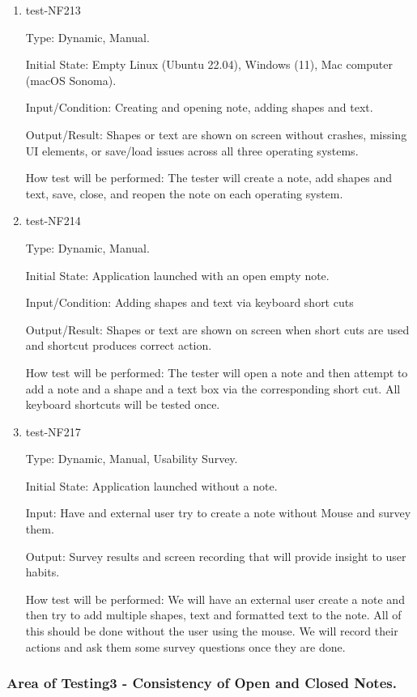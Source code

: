 \documentclass[12pt, titlepage]{article}
\begin{document}
\begin{enumerate}

\item{test-NF213}

Type: Dynamic, Manual.

Initial State: Empty Linux (Ubuntu 22.04), Windows (11), Mac computer (macOS Sonoma).

Input/Condition: Creating and opening note, adding shapes and text.

Output/Result: Shapes or text are shown on screen without crashes, missing UI elements, or save/load issues across all three operating systems.

How test will be performed: The tester will create a note, add shapes and text, save, close, and reopen the note on each operating system.

\item{test-NF214}

Type: Dynamic, Manual.

Initial State: Application launched with an open empty note.

Input/Condition: Adding shapes and text via keyboard short cuts

Output/Result: Shapes or text are shown on screen when short cuts are used and shortcut produces correct action.

How test will be performed: The tester will open a note and then attempt to add a note and a shape and a text box via the corresponding short cut. All keyboard shortcuts will be tested once.

\item{test-NF217}

Type:  Dynamic, Manual, Usability Survey.

Initial State: Application launched without a note.

Input: Have and external user try to create a note without Mouse and survey them.

Output: Survey results and screen recording that will provide insight to user habits.

How test will be performed: We will have an external user create a note and then try to add multiple shapes, text and formatted text to the note. All of this should be done without the user using the mouse. We will record their actions and ask them some survey questions once they are done.

\end{enumerate}

\subsubsection{Area of Testing3 - Consistency of Open and Closed Notes.}
\end{document}
